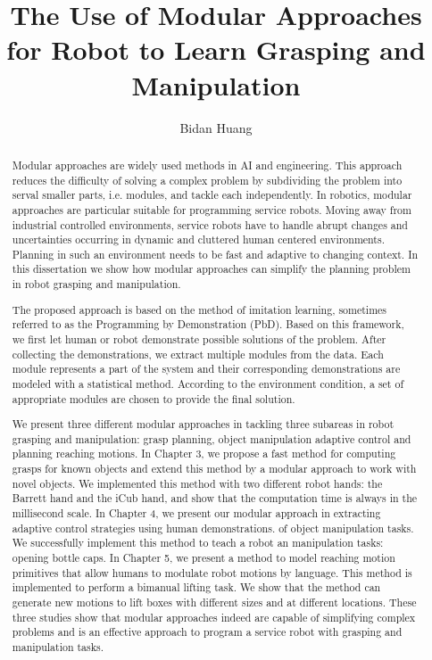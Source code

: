 \documentclass[11pt]{report}
\title{The Use of Modular Approaches for Robot to Learn Grasping and Manipulation}
\author{Bidan Huang}
\begin{document}
\maketitle


\begin{abstract}
Modular approaches are widely used methods in AI and engineering. This approach reduces the difficulty of solving a complex problem by subdividing the problem into serval smaller parts, i.e. modules, and tackle each independently.
In robotics, modular approaches are particular suitable for programming service robots.
Moving away from industrial controlled environments, service robots have to handle abrupt changes and uncertainties occurring in dynamic and cluttered human centered environments. Planning in such an environment needs to be fast and adaptive to changing context. In this dissertation we show how modular approaches can simplify the planning problem in robot grasping and manipulation. %

The proposed approach is based on the method of imitation learning, sometimes referred to as the Programming by Demonstration (PbD). Based on this framework, we first let human or robot demonstrate possible solutions of the problem. After collecting the demonstrations, we extract multiple modules from the data. Each module represents a part of the system and their corresponding demonstrations are modeled with a statistical method. According to the environment condition, a set of appropriate modules are chosen to provide the final solution.

We present three different modular approaches in tackling three subareas in robot grasping and manipulation: grasp planning, object manipulation adaptive control and planning reaching motions. In Chapter 3, we propose a fast method for computing grasps for known objects and extend this method by a modular approach to work with novel objects. We implemented this method with two different robot hands: the Barrett hand and the iCub hand, and show that the computation time is always in the millisecond scale. In Chapter 4, we present our modular approach in extracting adaptive control strategies using human demonstrations. of object manipulation tasks. We successfully implement this method to teach a robot an manipulation tasks: opening bottle caps. In Chapter 5, we present a method to model reaching motion primitives that allow humans to modulate robot motions by language. This method is implemented to perform a bimanual lifting task. We show that the method can generate new motions to lift boxes with different sizes and at different locations. These three studies show that modular approaches indeed are capable of simplifying complex problems and is an effective approach to program a service robot with grasping and manipulation tasks.


\end{abstract}
\end{document}

